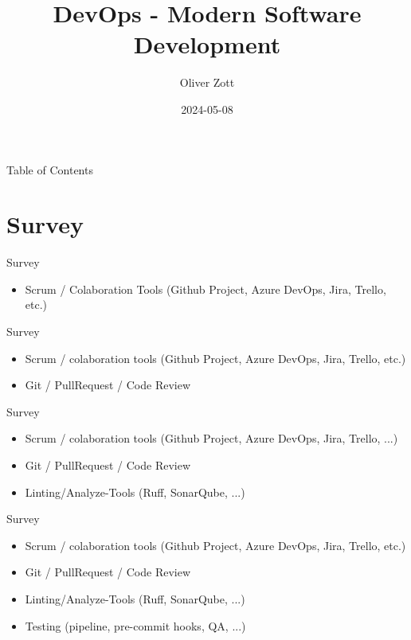 \documentclass[10pt]{beamer}
\title{DevOps - Modern Software Development}
\author{Oliver Zott}
\date{2024-05-08}
\begin{document}

\begin{frame}
	\titlepage
\end{frame}

\begin{frame}{Table of Contents}
 	\tableofcontents
\end{frame}

\section{Survey}

\begin{frame}{Survey}
	\begin{itemize}
		\item Scrum / Colaboration Tools (Github Project, Azure DevOps, Jira, Trello, etc.)
	\end{itemize}
\end{frame}

\begin{frame}{Survey}
	\begin{itemize}
		\item Scrum / colaboration tools (Github Project, Azure DevOps, Jira, Trello, etc.)
		\item Git / PullRequest / Code Review
	\end{itemize}
\end{frame}

\begin{frame}{Survey}
	\begin{itemize}
		\item Scrum / colaboration tools (Github Project, Azure DevOps, Jira, Trello, ...)
		\item Git / PullRequest / Code Review
		\item Linting/Analyze-Tools (Ruff, SonarQube, ...)
	\end{itemize}
\end{frame}

\begin{frame}{Survey}
	\begin{itemize}
		\item Scrum / colaboration tools (Github Project, Azure DevOps, Jira, Trello, etc.)
		\item Git / PullRequest / Code Review
		\item Linting/Analyze-Tools (Ruff, SonarQube, ...)
		\item Testing (pipeline, pre-commit hooks, QA, ...)
	\end{itemize}
\end{frame}
\end{document}
